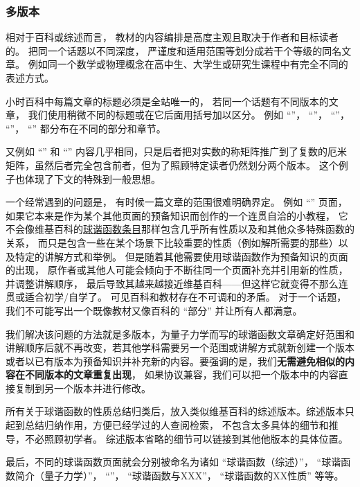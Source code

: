 \subsubsection{多版本}
相对于百科或综述而言， 教材的内容编排是高度主观且取决于作者和目标读者的。 把同一个话题以不同深度， 严谨度和适用范围等划分成若干个等级的同名文章。 例如同一个数学或物理概念在高中生、大学生或研究生课程中有完全不同的表述方式。

小时百科中每篇文章的标题必须是全站唯一的， 若同一个话题有不同版本的文章， 我们使用稍微不同的标题或在它后面用括号加以区分。 例如 “”， “”， “”， “”， “” 都分布在不同的部分和章节。

又例如 “” 和 “” 内容几乎相同，只是后者把对实数的称矩阵推广到了复数的厄米矩阵，虽然后者完全包含前者，但为了照顾特定读者仍然划分两个版本。 这个例子也体现了下文的特殊到一般思想。


一个经常遇到的问题是， 有时候一篇文章的范围很难明确界定。 例如 “” 页面， 如果它本来是作为某个其他页面的预备知识而创作的一个连贯自洽的小教程， 它不会像维基百科的\href{https://en.wikipedia.org/wiki/Spherical_harmonics}{球谐函数条目}那样包含几乎所有性质以及和其他众多特殊函数的关系， 而只是包含一些在某个场景下比较重要的性质（例如解所需要的那些）以及特定的讲解方式和举例。 但是随着其他需要使用球谐函数作为预备知识的页面的出现， 原作者或其他人可能会倾向于不断往同一个页面补充并引用新的性质， 并调整讲解顺序， 最后导致其越来越接近维基百科——但这样它就变得不那么连贯或适合初学/自学了。 可见百科和教材存在不可调和的矛盾。 对于一个话题， 我们不可能写出一个既像教材又像百科的 “部分” 并让所有人都满意。

我们解决该问题的方法就是多版本，为量子力学而写的球谐函数文章确定好范围和讲解顺序后就不再改变，若其他学科需要另一个范围或讲解方式就新创建一个版本或者以已有版本为预备知识并补充新的内容。要强调的是，我们\textbf{无需避免相似的内容在不同版本的文章重复出现}， 如果协议兼容，我们可以把一个版本中的内容直接复制到另一个版本并进行修改。

所有关于球谐函数的性质总结归类后，放入类似维基百科的综述版本。综述版本只起到总结归纳作用，方便已经学过的人查阅检索， 不包含太多具体的细节和推导，不必照顾初学者。 综述版本省略的细节可以链接到其他他版本的具体位置。

最后，不同的球谐函数页面就会分别被命名为诸如 “球谐函数（综述）”， “球谐函数简介（量子力学）”， “”， “球谐函数与XXX”， “球谐函数的XX性质” 等等。


